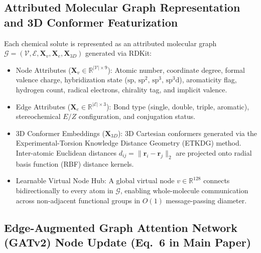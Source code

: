 \documentclass[11pt]{article}
\begin{document}
\subsection{Attributed Molecular Graph Representation and 3D Conformer Featurization}
Each chemical solute is represented as an attributed molecular graph $\mathcal{G} = (\mathcal{V}, \mathcal{E}, \mathbf{X}_v, \mathbf{X}_e, \mathbf{X}_{3D})$ generated via RDKit:
\begin{itemize}[leftmargin=1.0cm]
    \item Node Attributes ($\mathbf{X}_v \in \mathbb{R}^{|\mathcal{V}| \times 9}$): Atomic number, coordinate degree, formal valence charge, hybridization state ($\text{sp, sp}^2\text{, sp}^3\text{, sp}^3\text{d}$), aromaticity flag, hydrogen count, radical electrons, chirality tag, and implicit valence.
    \item Edge Attributes ($\mathbf{X}_e \in \mathbb{R}^{|\mathcal{E}| \times 3}$): Bond type (single, double, triple, aromatic), stereochemical $E/Z$ configuration, and conjugation status.
    \item 3D Conformer Embeddings ($\mathbf{X}_{3D}$): 3D Cartesian conformers generated via the Experimental-Torsion Knowledge Distance Geometry (ETKDG) method. Inter-atomic Euclidean distances $d_{ij} = \|\mathbf{r}_i - \mathbf{r}_j\|_2$ are projected onto radial basis function (RBF) distance kernels.
    \item Learnable Virtual Node Hub: A global virtual node $v \in \mathbb{R}^{128}$ connects bidirectionally to every atom in $\mathcal{G}$, enabling whole-molecule communication across non-adjacent functional groups in $O(1)$ message-passing diameter.
\end{itemize}

\subsection{Edge-Augmented Graph Attention Network (GATv2) Node Update (Eq.~6 in Main Paper)}
\label{sec:gat_update_derivation}
\end{document}

